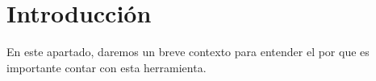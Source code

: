 \chapter{Introducción}
En este apartado, daremos un breve contexto para entender el por que es importante contar con esta herramienta.





